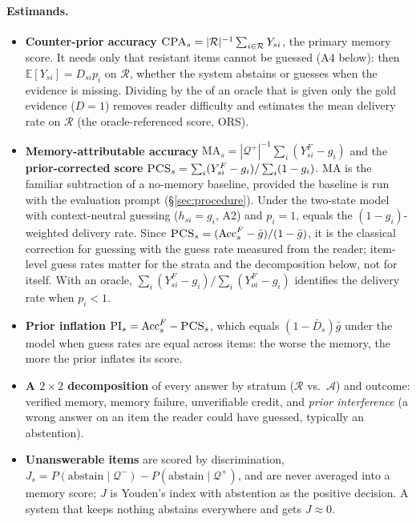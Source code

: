 \paragraph{Estimands.}
\begin{itemize}
\item \textbf{Counter-prior accuracy} $\textsc{CPA}_s = |\mathcal{R}|^{-1}\sum_{i\in\mathcal{R}} Y_{si}$, the primary memory
score. It needs only that resistant items cannot be guessed (A4 below): then $\mathbb{E}[Y_{si}]=D_{si}p_i$ on
$\mathcal{R}$, whether the system abstains or guesses when the evidence is missing. Dividing by the \cpr{} of an oracle
that is given only the gold evidence ($D=1$) removes reader difficulty and estimates the mean delivery rate on
$\mathcal{R}$ (the oracle-referenced score, ORS).
\item \textbf{Memory-attributable accuracy} $\mathrm{MA}_s=|\mathcal{Q}^+|^{-1}\sum_i (Y^F_{si}-g_i)$ and the
\textbf{prior-corrected score} $\textsc{PCS}_s=\sum_i(Y^F_{si}-g_i)/\sum_i(1-g_i)$. MA is the familiar subtraction of a
no-memory baseline, provided the baseline is run with the evaluation prompt (\S\ref{sec:procedure}). Under the two-state
model with context-neutral guessing ($h_{si}=g_i$, A2) and $p_i=1$, \pcs{} equals the $(1-g_i)$-weighted delivery rate.
Since $\textsc{PCS}_s=(\mathrm{Acc}^F_s-\bar g)/(1-\bar g)$, it is the classical correction for guessing
\citep{lord1968statistical} with the guess rate measured from the reader; item-level guess rates matter for the strata and
the decomposition below, not for \pcs{} itself. With an oracle, $\sum_i(Y^F_{si}-g_i)/\sum_i(Y^F_{oi}-g_i)$ identifies the
delivery rate when $p_i<1$.
\item \textbf{Prior inflation} $\mathrm{PI}_s=\mathrm{Acc}^F_s-\textsc{PCS}_s$, which equals $(1-\bar D_s)\bar g$ under the
model when guess rates are equal across items: the worse the memory, the more the prior inflates its score.
\item \textbf{A $2\times 2$ decomposition} of every answer by stratum ($\mathcal{R}$ vs.\ $\mathcal{A}$) and outcome:
verified memory, memory failure, unverifiable credit, and \emph{prior interference} (a wrong answer on an item the
reader could have guessed, typically an abstention).
\item \textbf{Unanswerable items} are scored by discrimination, $J_s=P(\text{abstain}\mid\mathcal{Q}^-)-P(\text{abstain}\mid\mathcal{Q}^+)$,
and are never averaged into a memory score; $J$ is Youden's index \citep{youden1950index} with abstention as the
positive decision. A system that keeps nothing abstains everywhere and gets $J\approx0$.
\end{itemize}

